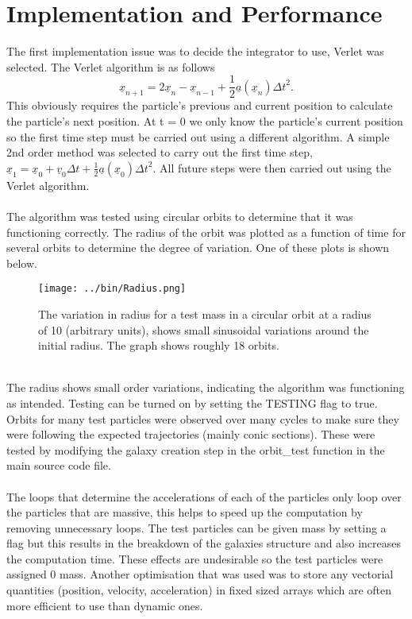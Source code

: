 \documentclass[10pt,a4paper]{article}
\begin{document}
\section{Implementation and Performance}
The first implementation issue was to decide the integrator to use, Verlet was selected. The Verlet algorithm is as follows 
\begin{equation}
	\underline{x}_{n+1} = 2 \underline{x}_n - \underline{x}_{n-1} + \frac{1}{2}  \underline{a}(\underline{x}_n) {\Delta t }^ 2 .
\end{equation}  
This obviously requires the particle's previous and current position to calculate the particle's next position. At t = 0 we only know the particle's current position so the first time step must be carried out using a different algorithm. A simple 2nd order method was selected to carry out the first time step, $\underline{x}_{1} =  \underline{x}_0 + \underline{v}_0 {\Delta t} + \frac{1}{2}  \underline{a}(\underline{x}_0) {\Delta t }^ 2 .$ All future steps were then carried out using the Verlet algorithm.
\\
\\
The algorithm was tested using circular orbits to determine that it was functioning correctly. The radius of the orbit was plotted as a function of time for several orbits to determine the degree of variation. One of these plots is shown below.
\begin{figure}[ht!]
\centering
\texttt{[image: ../bin/Radius.png]}
\caption{The variation in radius for a test mass in a circular orbit at a radius of 10 (arbitrary units), shows small sinusoidal variations around the initial radius. The graph shows roughly 18 orbits.
\label{radiusfig}}
\end{figure}
\\
The radius shows small order variations, indicating the algorithm was functioning as intended. Testing can be turned on by setting the TESTING flag to true. Orbits for many test particles were observed over many cycles to make sure they were following the expected trajectories (mainly conic sections). These were tested by modifying the galaxy creation step in the orbit\_test function in the main source code file.
\\
\\
The loops that determine the accelerations of each of the particles only loop over the particles that are massive, this helps to speed up the computation by removing unnecessary loops. The test particles can be given mass by setting a flag but this results in the breakdown of the galaxies structure and also increases the computation time. These effects are undesirable so the test particles were assigned 0 mass. Another optimisation that was used was to store any vectorial quantities (position, velocity, acceleration) in fixed sized arrays which are often more efficient to use than dynamic ones.
\end{document}
